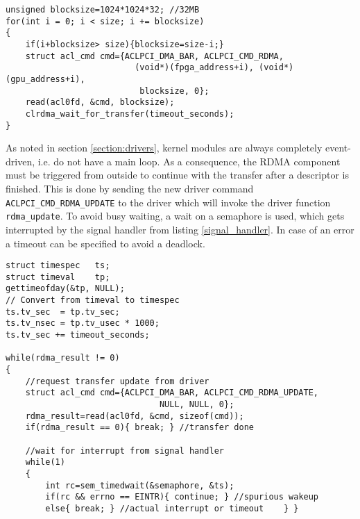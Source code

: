 \begin{lstlisting}[label=rdma_read,caption=RDMA transfer initation]
unsigned blocksize=1024*1024*32; //32MB
for(int i = 0; i < size; i += blocksize)
{
	if(i+blocksize> size){blocksize=size-i;}
	struct acl_cmd cmd={ACLPCI_DMA_BAR, ACLPCI_CMD_RDMA, 
		                  (void*)(fpga_address+i), (void*)(gpu_address+i),
		                   blocksize, 0};
	read(acl0fd, &cmd, blocksize);
	clrdma_wait_for_transfer(timeout_seconds);
}
\end{lstlisting}


As noted in section \ref{section:drivers}, kernel modules are always completely event-driven, i.e. do not have a main loop.
As a consequence, the RDMA component must be triggered from outside to continue with the transfer after a descriptor is finished.
This is done by sending the new driver command \texttt{ACLPCI\_CMD\_RDMA\_UPDATE} to the driver which will invoke the driver function \texttt{rdma\_update}.
To avoid busy waiting, a wait on a semaphore is used, which gets interrupted by the signal handler from listing \ref{signal_handler}.
In case of an error a timeout can be specified to avoid a deadlock.


\begin{lstlisting}[label=rdma_wait, caption=Driving the RDMA transfer]
struct timespec   ts;
struct timeval    tp;
gettimeofday(&tp, NULL);
// Convert from timeval to timespec
ts.tv_sec  = tp.tv_sec;
ts.tv_nsec = tp.tv_usec * 1000;
ts.tv_sec += timeout_seconds;

while(rdma_result != 0)
{
	//request transfer update from driver
	struct acl_cmd cmd={ACLPCI_DMA_BAR, ACLPCI_CMD_RDMA_UPDATE, 
	                           NULL, NULL, 0};
	rdma_result=read(acl0fd, &cmd, sizeof(cmd));
	if(rdma_result == 0){ break; } //transfer done
	
	//wait for interrupt from signal handler
	while(1)
	{
		int rc=sem_timedwait(&semaphore, &ts);
		if(rc && errno == EINTR){ continue; } //spurious wakeup
		else{ break; } //actual interrupt or timeout	} }
\end{lstlisting}





